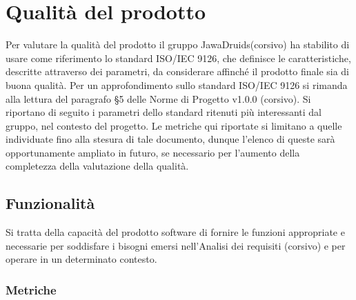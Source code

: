 \chapter{Qualità del prodotto} \label{Qualità del prodotto}

Per valutare la qualità del prodotto il gruppo JawaDruids(corsivo) ha stabilito di usare come riferimento lo standard ISO/IEC 9126, che definisce le caratteristiche, descritte attraverso dei parametri,  da considerare affinché il prodotto finale sia di buona qualità. 
Per un approfondimento sullo standard ISO/IEC 9126 si rimanda alla lettura del paragrafo §5 delle Norme di Progetto v1.0.0 (corsivo). 
Si riportano di seguito i parametri dello standard ritenuti più interessanti dal gruppo, nel contesto del  progetto.
Le metriche qui riportate si limitano a quelle individuate fino alla stesura di tale documento, dunque l’elenco di queste sarà opportunamente ampliato in futuro, se necessario per l’aumento della completezza della valutazione della qualità.

\section{Funzionalità} \label{3.1}
Si tratta della capacità del prodotto software di fornire le funzioni appropriate e necessarie per soddisfare i bisogni emersi nell’Analisi dei requisiti (corsivo) e per operare in un determinato contesto. 
\subsection{Metriche} \label{3.1.1}

